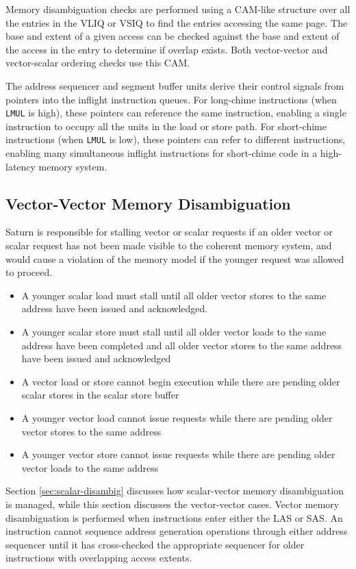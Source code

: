Memory disambiguation checks are performed using a CAM-like structure over all the entries in the VLIQ or VSIQ to find the entries accessing the same page.
The base and extent of a given access can be checked against the base and extent of the access in the entry to determine if overlap exists.
Both vector-vector and vector-scalar ordering checks use this CAM.

The address sequencer and segment buffer units derive their control signals from pointers into the inflight instruction queues.
For long-chime instructions (when \texttt{LMUL} is high), these pointers can reference the same instruction, enabling a single instruction to occupy all the units in the load or store path.
For short-chime instructions (when \texttt{LMUL} is low), these pointers can refer to different instructions, enabling many simultaneous inflight instructions for short-chime code in a high-latency memory system.

\subsection{Vector-Vector Memory Disambiguation}
\label{sec:vector-disambig}

Saturn is responsible for stalling vector or scalar requests if an older vector or scalar request has not been made visible to the coherent memory system, and would cause a violation of the memory model if the younger request was allowed to proceed.

\begin{itemize}
\item A younger scalar load must stall until all older vector stores to the same address have been issued and acknowledged.
\item A younger scalar store must stall until all older vector loads to the same address have been completed and all older vector stores to the same address have been issued and acknowledged
\item A vector load or store cannot begin execution while there are pending older scalar stores in the scalar store buffer
\item A younger vector load cannot issue requests while there are pending older vector stores to the same address
\item A younger vector store cannot issue requests while there are pending older vector loads to the same address
\end{itemize}

Section \ref{sec:scalar-disambig} discusses how scalar-vector memory disambiguation is managed, while this section discusses the vector-vector cases.
Vector memory disambiguation is performed when instructions enter either the LAS or SAS. An instruction cannot sequence address generation operations through either address sequencer until it has cross-checked the appropriate sequencer for older instructions with overlapping access extents.

